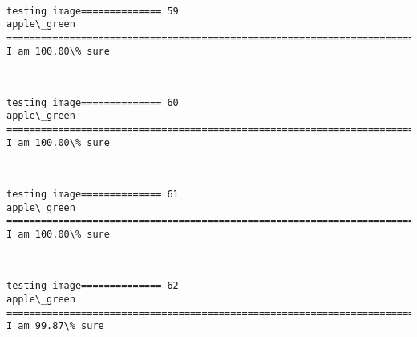 \documentclass[11pt]{article}
\begin{document}
    \begin{center}
    \end{center}
    { \hspace*{\fill} \\}
    
    \begin{Verbatim}[commandchars=\\\{\}]
testing image============== 59
apple\_green
============================================================================
I am 100.00\% sure

    \end{Verbatim}

    \begin{center}
    \end{center}
    { \hspace*{\fill} \\}
    
    \begin{Verbatim}[commandchars=\\\{\}]
testing image============== 60
apple\_green
============================================================================
I am 100.00\% sure

    \end{Verbatim}

    \begin{center}
    \end{center}
    { \hspace*{\fill} \\}
    
    \begin{Verbatim}[commandchars=\\\{\}]
testing image============== 61
apple\_green
============================================================================
I am 100.00\% sure

    \end{Verbatim}

    \begin{center}
    \end{center}
    { \hspace*{\fill} \\}
    
    \begin{Verbatim}[commandchars=\\\{\}]
testing image============== 62
apple\_green
============================================================================
I am 99.87\% sure

    \end{Verbatim}
\end{document}

